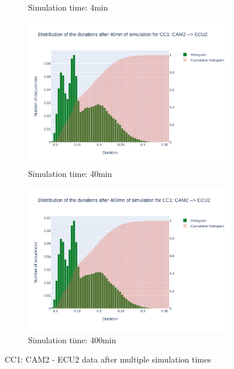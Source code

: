 \documentclass{article}
\begin{document}
\begin{figure}[H]
\begin{subfigure}{.495\textwidth}
        \caption{Simulation time: 4min}
        \vspace{.5cm}
    \end{subfigure}
    \begin{subfigure}{.495\textwidth}
        \centering
        \includegraphics[width=\textwidth]{../fig/data/CC1: CAM2 --> ECU2_40mn.png}
        \caption{Simulation time: 40min}
    \end{subfigure}
    \begin{subfigure}{.495\textwidth}
        \centering
        \includegraphics[width=\textwidth]{../fig/data/CC1: CAM2 --> ECU2_400mn.png}
        \caption{Simulation time: 400min}
    \end{subfigure}
    \caption{CC1: CAM2 - ECU2 data after multiple simulation times}
\end{figure}
\end{document}
